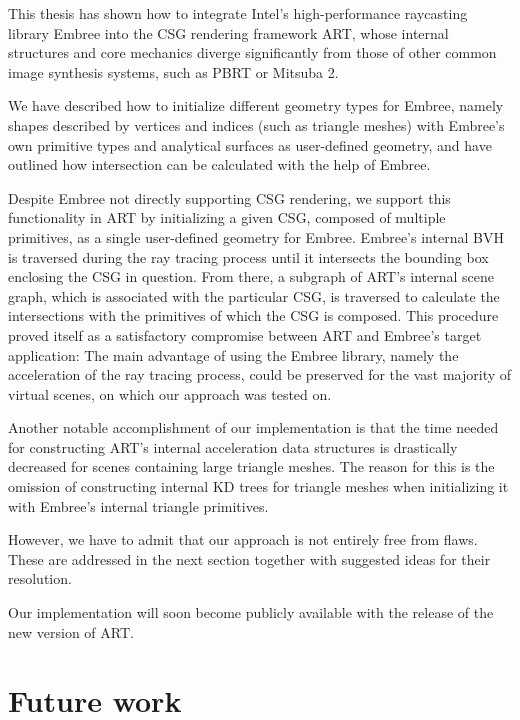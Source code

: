 \label{chap:conclusion}

This thesis has shown how to integrate Intel's high-performance raycasting library Embree into the CSG rendering framework ART, whose internal structures and core mechanics diverge significantly from those of other common image synthesis systems, such as PBRT or Mitsuba 2.

We have described how to initialize different geometry types for Embree, namely shapes described by vertices and indices (such as triangle meshes) with Embree's own primitive types and analytical surfaces as user-defined geometry, and have outlined how intersection can be calculated with the help of Embree. 

Despite Embree not directly supporting CSG rendering, we support this functionality in ART by initializing a given CSG, composed of multiple primitives, as a single user-defined geometry for Embree. Embree's internal BVH is traversed during the ray tracing process until it intersects the bounding box enclosing the CSG in question. From there, a subgraph of ART's internal scene graph, which is associated with the particular CSG, is traversed to calculate the intersections with the primitives of which the CSG is composed. This procedure proved itself as a satisfactory compromise between ART and Embree's target application: The main advantage of using the Embree library, namely the acceleration of the ray tracing process, could be preserved for the vast majority of virtual scenes, on which our approach was tested on.

Another notable accomplishment of our implementation is that the time needed for constructing ART's internal acceleration data structures is drastically decreased for scenes containing large triangle meshes. The reason for this is the omission of constructing internal KD trees for triangle meshes when initializing it with Embree's internal triangle primitives.

However, we have to admit that our approach is not entirely free from flaws. These are addressed in the next section together with suggested ideas for their resolution.  

Our implementation will soon become publicly available with the release of the new version of ART.

\section*{Future work}

